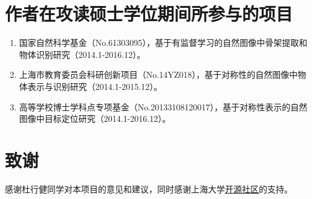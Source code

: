 \documentclass[UTF8]{ctexart}
\numberwithin{equation}{section} %
\numberwithin{table}{section} %
\begin{document}
\pagebreak
\section*{作者在攻读硕士学位期间所参与的项目}
\begin{enumerate}
\item 国家自然科学基金（No.61303095），基于有监督学习的自然图像中骨架提取和物体识别研究（2014.1-2016.12）。
\item 上海市教育委员会科研创新项目（No.14YZ018），基于对称性的自然图像中物体表示与识别研究（2014.1-2015.12）。
\item 高等学校博士学科点专项基金（No.20133108120017），基于对称性表示的自然图像中目标定位研究（2014.1-2016.12）。

\end{enumerate}

\pagebreak
\section*{致谢}
感谢杜行健同学对本项目的意见和建议，同时感谢上海大学\href{https://www.shuosc.org/}{开源社区}的支持。
\end{document}
